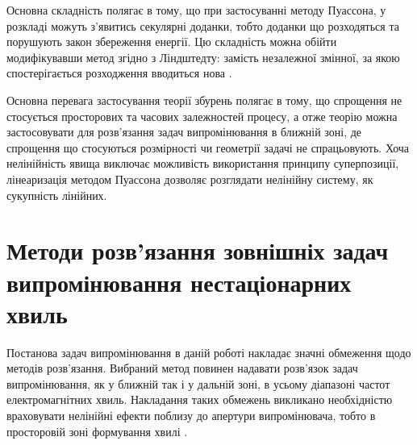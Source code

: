 Основна складність полягає в тому, що при застосуванні методу Пуассона, у 
розкладі можуть з'явитись секулярні доданки, тобто доданки що розходяться та 
порушують закон збереження енергії. Цю складність можна обійти модифікувавши 
метод згідно з Ліндштедту: замість незалежної змінної, за якою 
спостерігається розходження вводиться нова \cite{imp:Wien1931}.

Основна перевага застосування теорії збурень полягає в тому, що спрощення
не стосується просторових та часових залежностей процесу, а отже теорію можна 
застосовувати для розв'язання задач випромінювання в ближній зоні, де 
спрощення що стосуються розмірності чи геометрії задачі не спрацьовують.
Хоча нелінійність явища виключає можливість використання принципу 
суперпозиції, лінеаризація методом Пуассона дозволяє розглядати нелінійну 
систему, як сукупність лінійних. 

\section{Методи розв'язання зовнішніх задач випромінювання нестаціонарних хвиль}


Постанова задач випромінювання в даній роботі накладає значні обмеження щодо 
методів розв'язання. Вибраний метод повинен надавати розв'язок задач 
випромінювання, як у ближній так і у дальній зоні, в усьому діапазоні 
частот електромагнітних хвиль. Накладання таких обмежень викликано
необхідністю враховувати нелінійні ефекти поблизу до апертури випромінювача, 
тобто в просторовій зоні формування хвилі \cite{imp:BaumUWBSP1}.



